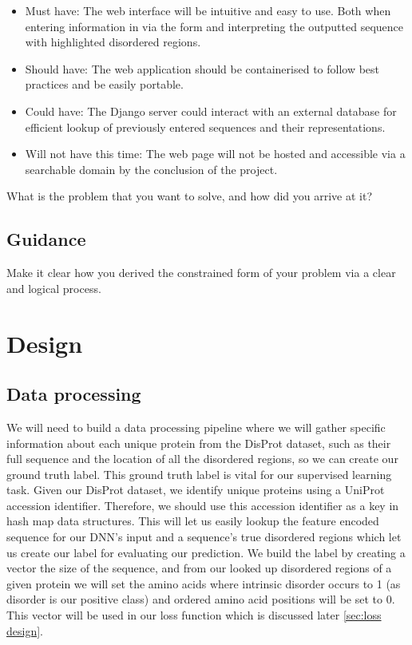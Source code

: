\documentclass{l4proj}
\begin{document}
\begin{itemize}    
    \item Must have: The web interface will be intuitive and easy to use. Both when entering information in via the form and interpreting the outputted sequence with highlighted disordered regions.
    \item Should have: The web application should be containerised to follow best practices and be easily portable.
    \item Could have: The Django server could interact with an external database for efficient lookup of previously entered sequences and their representations.
    \item Will not have this time: The web page will not be hosted and accessible via a searchable domain by the conclusion of the project.
\end{itemize}


\newpage
What is the problem that you want to solve, and how did you arrive at it?
\section{Guidance}
Make it clear how you derived the constrained form of your problem via a clear and logical process. 

\chapter{Design}
\label{chap:design}

\section{Data processing}

We will need to build a data processing pipeline where we will gather specific information about each unique protein from the DisProt dataset, such as their full sequence and the location of all the disordered regions, so we can create our ground truth label. This ground truth label is vital for our supervised learning task. Given our DisProt dataset, we identify unique proteins using a UniProt accession identifier. Therefore, we should use this accession identifier as a key in hash map data structures. This will let us easily lookup the feature encoded sequence for our DNN's input and a sequence’s true disordered regions which let us create our label for evaluating our prediction. We build the label by creating a vector the size of the sequence, and from our looked up disordered regions of a given protein we will set the amino acids where intrinsic disorder occurs to 1 (as disorder is our positive class) and ordered amino acid positions will be set to 0. This vector will be used in our loss function which is discussed later \ref{sec:loss design}. 
\end{document}
